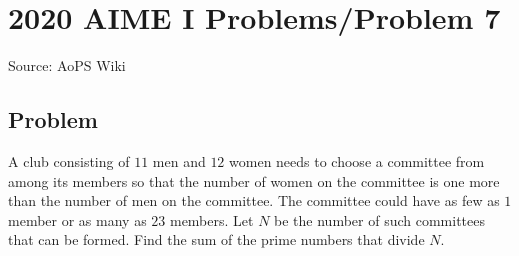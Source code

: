 \documentclass[12pt]{article}
\begin{document}
\section*{{2020 AIME I Problems/Problem 7}}
Source: AoPS Wiki

\subsection*{Problem}
A club consisting of $11$ men and $12$ women needs to choose a committee from among its members so that the number of women on the committee is one more than the number of men on the committee. The committee could have as few as $1$ member or as many as $23$ members. Let $N$ be the number of such committees that can be formed. Find the sum of the prime numbers that divide $N.$
\end{document}
